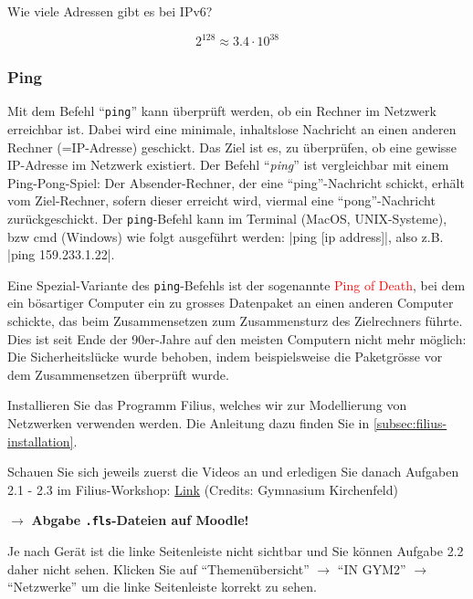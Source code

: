 \begin{myexercise}
	Wie viele Adressen gibt es bei IPv6?
	\begin{myanswer}
		\[2^{128} \approx 3.4\cdot 10^{38}\]
	\end{myanswer}
\end{myexercise}


\subsubsection{Ping}
Mit dem Befehl ``\texttt{ping}'' kann überprüft werden, ob ein Rechner im Netzwerk erreichbar ist. Dabei wird eine minimale, inhaltslose Nachricht an einen anderen Rechner (=IP-Adresse) geschickt. Das Ziel ist es, zu überprüfen, ob eine gewisse IP-Adresse im Netzwerk existiert. Der Befehl ``\textit{ping}'' ist vergleichbar mit einem Ping-Pong-Spiel: Der Absender-Rechner, der eine ``ping''-Nachricht schickt, erhält vom Ziel-Rechner, sofern dieser erreicht wird, viermal eine ``pong''-Nachricht zurückgeschickt. Der \texttt{ping}-Befehl kann im Terminal (MacOS, UNIX-Systeme), bzw cmd (Windows) wie folgt ausgeführt werden: \commandbox|ping [ip address]|, also z.B. \commandbox|ping 159.233.1.22|.

\begin{mycaution}
	Eine Spezial-Variante des \texttt{ping}-Befehls ist der sogenannte \textcolor{red}{\faSkull{} Ping of Death}, bei dem ein bösartiger Computer ein zu grosses Datenpaket an einen anderen Computer schickte, das beim Zusammensetzen zum Zusammensturz des Zielrechners führte. Dies ist seit Ende der 90er-Jahre auf den meisten Computern nicht mehr möglich: Die Sicherheitslücke wurde behoben, indem beispielsweise die Paketgrösse vor dem Zusammensetzen überprüft wurde.
\end{mycaution}

\begin{myexercise}
	Installieren Sie das Programm Filius, welches wir zur Modellierung von Netzwerken verwenden werden. Die Anleitung dazu finden Sie in \cref{subsec:filius-installation}.
\end{myexercise}

\begin{myexercise}
	Schauen Sie sich jeweils zuerst die Videos an und erledigen Sie danach Aufgaben 2.1 - 2.3 im Filius-Workshop: \href{https://informatik.mygymer.ch/base/?book=network}{Link} (Credits: Gymnasium Kirchenfeld)

	$\rightarrow$ \textbf{Abgabe \texttt{.fls}-Dateien auf Moodle!}
	\begin{mycaution}
		Je nach Gerät ist die linke Seitenleiste nicht sichtbar und Sie können Aufgabe 2.2 daher nicht sehen. Klicken Sie auf ``Themenübersicht'' $\rightarrow$  ``IN GYM2'' $\rightarrow$ ``Netzwerke'' um die linke Seitenleiste korrekt zu sehen.
	\end{mycaution}
\end{myexercise}

